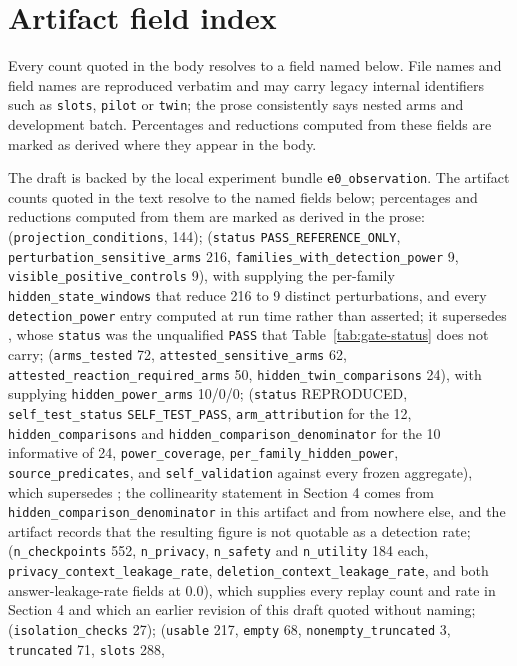\documentclass[11pt]{article}
\begin{document}
\section{Artifact field index}
\label{app:availability-index}
Every count quoted in the body resolves to a field named below. File names and field names are reproduced verbatim and may carry legacy internal identifiers such as \texttt{slots}, \texttt{pilot} or \texttt{twin}; the prose consistently says nested arms and development batch. Percentages and reductions computed from these fields are marked as derived where they appear in the body.
\begin{sloppypar}
The draft is backed by the local experiment bundle \texttt{e0\_observation}. The artifact counts quoted in the text resolve to the named fields below; percentages and reductions computed from them are marked as derived in the prose:  (\texttt{projection\_conditions}, 144);  (\texttt{status} \texttt{PASS\_REFERENCE\_ONLY}, \texttt{perturbation\_sensitive\_arms} 216, \texttt{families\_with\_detection\_power} 9, \texttt{visible\_positive\_controls} 9), with  supplying the per-family \texttt{hidden\_state\_windows} that reduce 216 to 9 distinct perturbations, and every \texttt{detection\_power} entry computed at run time rather than asserted; it supersedes , whose \texttt{status} was the unqualified \texttt{PASS} that Table~\ref{tab:gate-status} does not carry;  (\texttt{arms\_tested} 72, \texttt{attested\_sensitive\_arms} 62, \texttt{attested\_reaction\_required\_arms} 50, \texttt{hidden\_twin\_comparisons} 24), with  supplying \texttt{hidden\_power\_arms} 10/0/0;  (\texttt{status} REPRODUCED, \texttt{self\_test\_status} \texttt{SELF\_TEST\_PASS}, \texttt{arm\_attribution} for the 12, \texttt{hidden\_comparisons} and \texttt{hidden\_comparison\_denominator} for the 10 informative of 24, \texttt{power\_coverage}, \texttt{per\_family\_hidden\_power}, \texttt{source\_predicates}, and \texttt{self\_validation} against every frozen aggregate), which supersedes ; the collinearity statement in Section 4 comes from \texttt{hidden\_comparison\_denominator} in this artifact and from nowhere else, and the artifact records that the resulting figure is not quotable as a detection rate;  (\texttt{n\_checkpoints} 552, \texttt{n\_privacy}, \texttt{n\_safety} and \texttt{n\_utility} 184 each, \texttt{privacy\_context\_leakage\_rate}, \texttt{deletion\_context\_leakage\_rate}, and both answer-leakage-rate fields at 0.0), which supplies every replay count and rate in Section 4 and which an earlier revision of this draft quoted without naming;  (\texttt{isolation\_checks} 27);  (\texttt{usable} 217, \texttt{empty} 68, \texttt{nonempty\_truncated} 3, \texttt{truncated} 71, \texttt{slots} 288, 
\end{sloppypar}
\end{document}
